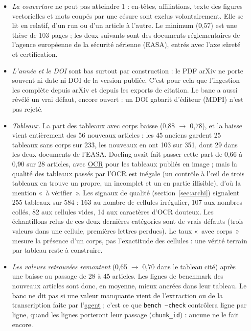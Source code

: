 \documentclass[11pt,a4paper]{article}
\newcommand{\cmd}[1]{\texttt{#1}}
\newcommand{\gl}[2]{\hyperlink{gl:#1}{\textcolor{glcolor}{#2}}}
\begin{document}
\begin{itemize}
  \item \emph{La couverture} ne peut pas atteindre 1 : en-têtes, affiliations, texte des
    figures vectorielles et mots coupés par une césure sont exclus volontairement. Elle se
    lit en relatif, d'un run ou d'un article à l'autre. Le minimum (0,57) est une thèse de
    103 pages ; les deux suivants sont des documents réglementaires de l'agence européenne
    de la sécurité aérienne (EASA), entrés avec l'axe sûreté et certification.
  \item \emph{L'année et le DOI} sont bas surtout par construction : le PDF arXiv ne porte
    souvent ni date ni DOI de la version publiée. C'est pour cela que l'ingestion les
    complète depuis arXiv et depuis les exports de citation. Le banc a aussi révélé un vrai
    défaut, encore ouvert : un DOI gabarit d'éditeur (MDPI) n'est pas rejeté.
  \item \emph{Tableaux.} La part des tableaux avec corps baisse (0,88 $\rightarrow$ 0,78), et
    la baisse vient entièrement des 56 nouveaux articles : les 45 anciens gardent 25 tableaux
    sans corps sur 233, les nouveaux en ont 103 sur 351, dont 29 dans les deux documents de
    l'EASA. Docling avait
    fait passer cette part de 0,66 à 0,90 sur 28 articles, avec \gl{OCR}{OCR} pour les tableaux publiés
    en image ; mais la qualité des tableaux passés par l'OCR est inégale (un contrôle à l'œil
    de trois tableaux en trouve un propre, un incomplet et un en partie illisible), d'où la
    mention «~à vérifier~». Les signaux de qualité (section~\ref{sec:archi}) signalent 255
    tableaux sur 584 : 163 au nombre de cellules irrégulier, 107 aux nombres collés, 82 aux
    cellules vides, 14 aux caractères d'OCR douteux. Les échantillons relus de ces deux
    dernières catégories sont de vrais défauts (trois valeurs dans une cellule, premières
    lettres perdues). Le taux «~avec corps~» mesure la présence d'un corps, pas l'exactitude
    des cellules : une vérité terrain par tableau reste à construire.
  \item \emph{Les valeurs retrouvées remontent} (0,65 $\rightarrow$ 0,70 dans le tableau cité)
    après une baisse au passage de 28 à 45 articles. Les lignes de benchmark des nouveaux
    articles sont donc, en moyenne, mieux ancrées dans leur tableau. Le banc ne dit pas si
    une valeur manquante vient de l'extraction ou de la transcription faite par l'\gl{agent}{agent} ;
    c'est ce que \cmd{bench --check} contrôlera ligne par ligne, quand les lignes porteront
    leur passage (\cmd{chunk\_id}) : aucune ne le fait encore.
\end{itemize}
\end{document}
